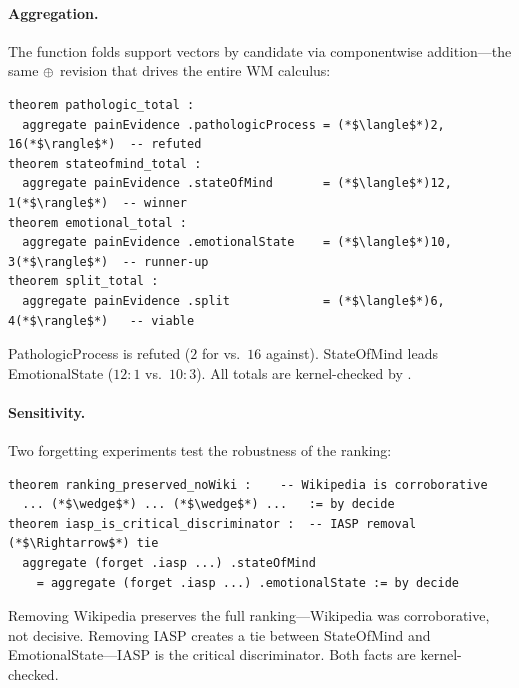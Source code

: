 \documentclass[11pt,openany]{report}
\begin{document}
\paragraph{Aggregation.}
The  function folds support vectors by candidate
via componentwise addition---the same $\oplus$ revision that
drives the entire WM calculus:

\begin{lstlisting}[language={}]
theorem pathologic_total :
  aggregate painEvidence .pathologicProcess = (*$\langle$*)2, 16(*$\rangle$*)  -- refuted
theorem stateofmind_total :
  aggregate painEvidence .stateOfMind       = (*$\langle$*)12, 1(*$\rangle$*)  -- winner
theorem emotional_total :
  aggregate painEvidence .emotionalState    = (*$\langle$*)10, 3(*$\rangle$*)  -- runner-up
theorem split_total :
  aggregate painEvidence .split             = (*$\langle$*)6, 4(*$\rangle$*)   -- viable
\end{lstlisting}

\noindent
PathologicProcess is refuted ($2$ for vs.\ $16$ against).
StateOfMind leads EmotionalState ($12{:}1$ vs.\ $10{:}3$).
All totals are kernel-checked by .

\paragraph{Sensitivity.}
Two forgetting experiments test the robustness of the ranking:

\begin{lstlisting}[language={}]
theorem ranking_preserved_noWiki :    -- Wikipedia is corroborative
  ... (*$\wedge$*) ... (*$\wedge$*) ...   := by decide
theorem iasp_is_critical_discriminator :  -- IASP removal (*$\Rightarrow$*) tie
  aggregate (forget .iasp ...) .stateOfMind
    = aggregate (forget .iasp ...) .emotionalState := by decide
\end{lstlisting}

\noindent
Removing Wikipedia preserves the full ranking---Wikipedia was
corroborative, not decisive.  Removing IASP creates a tie between
StateOfMind and EmotionalState---IASP is the critical
discriminator.  Both facts are kernel-checked.
\end{document}

